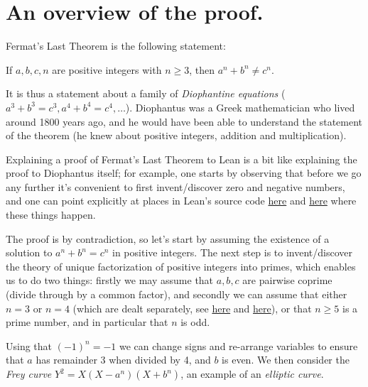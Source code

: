 \chapter{An overview of the proof.}

Fermat's Last Theorem is the following statement:

\begin{theorem}\label{FLT}\tangled
If $a,b,c,n$ are positive integers with $n\geq 3$, then $a^n+b^n\not=c^n$.
\end{theorem}

It is thus a statement about a family of \emph{Diophantine equations} ($a^3+b^3=c^3, a^4+b^4=c^4,\ldots$). Diophantus was a Greek mathematician who lived around 1800 years ago, and he would have been able to understand the statement of the theorem (he knew about positive integers, addition and multiplication).

Explaining a proof of Fermat's Last Theorem to Lean is a bit like explaining the proof to Diophantus itself; for example, one starts by observing that before we go any further it's convenient to first invent/discover zero and negative numbers, and one can point explicitly at places in Lean's source code \href{https://github.com/leanprover/lean4/blob/260eaebf4e804c9ac1319532970544a4e157c336/src/Init/Prelude.lean#L1049}{here} and \href{https://github.com/leanprover/lean4/blob/260eaebf4e804c9ac1319532970544a4e157c336/src/Init/Data/Int/Basic.lean#L45}{here} where these things happen.

The proof is by contradiction, so let's start by assuming the existence of a solution to $a^n+b^n=c^n$ in positive integers. The next step is to invent/discover the theory of unique factorization of positive integers into primes, which enables us to do two things: firstly we may assume that $a,b,c$ are pairwise coprime (divide through by a common factor), and secondly we can assume that either $n=3$ or $n=4$ (which are dealt separately, see \href{https://github.com/leanprover-community/flt-regular/blob/1eac0e08635793fd9f373ee789620ca7266bc6b8/FltRegular/FltThree/FltThree.lean#L718-L728}{here} and \href{docs#fermatLastTheoremFour}{here}), or that $n\geq 5$ is a prime number, and in particular that $n$ is odd.

Using that $(-1)^n=-1$ we can change signs and re-arrange variables to ensure that $a$ has remainder 3 when divided by 4, and $b$ is even. We then consider the \emph{Frey curve} $Y^2=X(X-a^n)(X+b^n)$, an example of an \emph{elliptic curve}.


